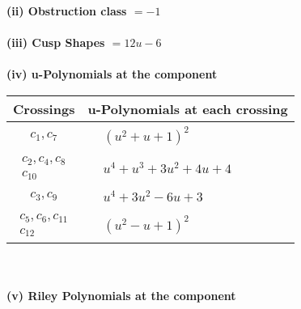 \documentclass[1p]{elsarticle_modified}
\theoremstyle{definition}
\begin{document}
\flushleft \textbf{(ii) Obstruction class $= -1$}\\~\\
\flushleft \textbf{(iii) Cusp Shapes $= 12 u-6$}\\~\\
\newpage\renewcommand{\arraystretch}{1}
\flushleft \textbf{(iv) u-Polynomials at the component}\newline \\
\begin{tabular}{m{50pt}|m{274pt}}
Crossings & \hspace{64pt}u-Polynomials at each crossing \\
\hline $$\begin{aligned}c_{1},c_{7}\end{aligned}$$&$\begin{aligned}
&(u^2+u+1)^2
\end{aligned}$\\
\hline $$\begin{aligned}c_{2},c_{4},c_{8}\\c_{10}\end{aligned}$$&$\begin{aligned}
&u^4+u^3+3 u^2+4 u+4
\end{aligned}$\\
\hline $$\begin{aligned}c_{3},c_{9}\end{aligned}$$&$\begin{aligned}
&u^4+3 u^2-6 u+3
\end{aligned}$\\
\hline $$\begin{aligned}c_{5},c_{6},c_{11}\\c_{12}\end{aligned}$$&$\begin{aligned}
&(u^2- u+1)^2
\end{aligned}$\\
\hline
\end{tabular}\\~\\
\newpage\renewcommand{\arraystretch}{1}
\flushleft \textbf{(v) Riley Polynomials at the component}\newline \\
\end{document}
